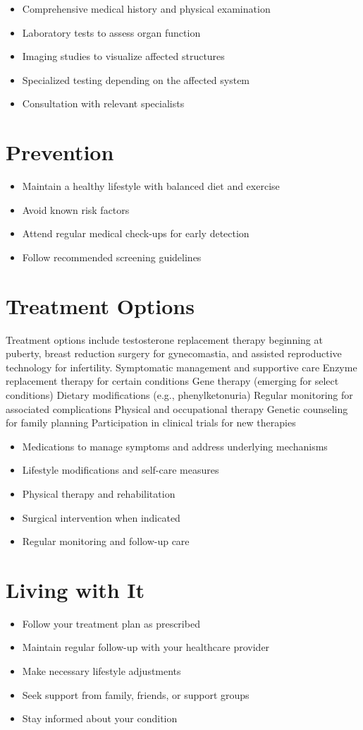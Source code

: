 \begin{itemize}[noitemsep]
  \item Comprehensive medical history and physical examination
  \item Laboratory tests to assess organ function
  \item Imaging studies to visualize affected structures
  \item Specialized testing depending on the affected system
  \item Consultation with relevant specialists
\end{itemize}
\section{Prevention}
\begin{itemize}[noitemsep]
  \item Maintain a healthy lifestyle with balanced diet and exercise
  \item Avoid known risk factors
  \item Attend regular medical check-ups for early detection
  \item Follow recommended screening guidelines
\end{itemize}
\section{Treatment Options}
Treatment options include testosterone replacement therapy beginning at puberty, breast reduction surgery for gynecomastia, and assisted reproductive technology for infertility. Symptomatic management and supportive care Enzyme replacement therapy for certain conditions Gene therapy (emerging for select conditions) Dietary modifications (e.g., phenylketonuria) Regular monitoring for associated complications Physical and occupational therapy Genetic counseling for family planning Participation in clinical trials for new therapies

\begin{itemize}[noitemsep]
  \item Medications to manage symptoms and address underlying mechanisms
  \item Lifestyle modifications and self-care measures
  \item Physical therapy and rehabilitation
  \item Surgical intervention when indicated
  \item Regular monitoring and follow-up care
\end{itemize}
\section{Living with It}
\begin{itemize}[noitemsep]
  \item Follow your treatment plan as prescribed
  \item Maintain regular follow-up with your healthcare provider
  \item Make necessary lifestyle adjustments
  \item Seek support from family, friends, or support groups
  \item Stay informed about your condition
\end{itemize}
